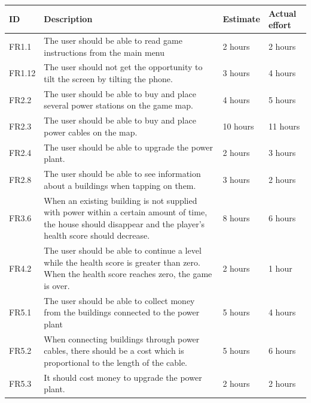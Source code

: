 	\begin{table}[H]
	\begin{tabular}{| p{1cm} | p{7cm} | p{2cm} | p{2cm} |}
		\hline
		\rowcolor{gray}
		ID & Description & Estimate & Actual effort \\ \hline
		FR1.1 & The user should be able to read game instructions from the main menu
		& 2 hours & 2 hours \\ \hline

		FR1.12 & The user should not get the opportunity to tilt the screen by tilting the phone. 
		& 3 hours & 4 hours \\ \hline
		
		FR2.2 & The user should be able to buy and place several power stations on the game map.
		& 4 hours & 5 hours \\ \hline

		FR2.3 & The user should be able to buy and place power cables on the map. 
		& 10 hours & 11 hours \\ \hline

		FR2.4 & The user should be able to upgrade the power plant. 
		& 2 hours & 3 hours \\ \hline

		FR2.8 & The user should be able to see information about a buildings when tapping on them.
		& 3 hours & 2 hours \\ \hline

		FR3.6 & When an existing building is not supplied with power within a certain amount of time, 
		the house should disappear and the player's health score should decrease. 
		& 8 hours & 6 hours \\ \hline

		FR4.2 & The user should be able to continue a level while the health score is greater than zero. 
		When the health score reaches zero, the game is over. 
		& 2 hours & 1 hour \\ \hline

		FR5.1 & The user should be able to collect money from the buildings connected to the power plant
		& 5 hours & 4 hours \\ \hline

		FR5.2 & When connecting buildings through power cables, there should be a cost which is 
		proportional to the length of the cable. 
		& 5 hours & 6 hours \\ \hline

		FR5.3 & It should cost money to upgrade the power plant. 
		& 2 hours & 2 hours \\ \hline


\end{tabular}
\end{table}
